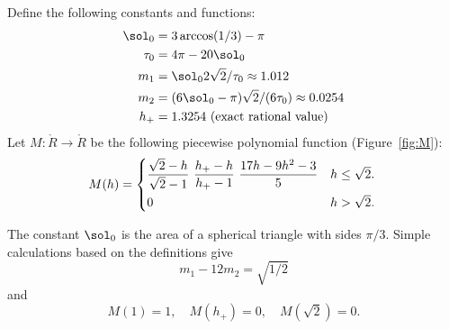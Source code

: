 \begin{definition} 
%
%
%
%
%
%
Define the following constants and functions: 
\begin{align}\label{eqn:m-def} 
\sol_0 &= 3\arccos(1/3)-\pi\\
\tau_0 &= 4\pi  - 20\sol_0\\
m_1 &= \sol_0 2\sqrt2/\tau_0 \approx 1.012 \\ %
m_2  &=  (6\sol_0- \pi)\sqrt2/(6 \tau_0) \approx 0.0254\\ %
h_+ &= 1.3254 \hbox{~(exact rational value)}
\end{align}
Let $M:\ring{R}\to\ring{R}$ 
be the following piecewise polynomial function (Figure~\ref{fig:M}):
\begin{equation}\label{eqn:M} 
M(h) =
\begin{cases} 
\dfrac{\sqrt2-h}{\sqrt2-1}~%
\dfrac{h_+-h}{h_+-1} ~\dfrac{17 h - 9 h^2 - 3}{5} 
& h \le \sqrt2.\vspace{3pt} \\
0 & h >\sqrt2.
\end{cases}
\\
\end{equation}
\end{definition}

\tuligly

The constant $\sol_0$
is the area of a spherical triangle with sides $\pi/3$.
Simple calculations based on the definitions give
\begin{equation}\label{eqn:km}
m_1 - 12m_2 = \sqrt{1/2}
\end{equation} 
and
\begin{equation}
M(1) = 1,\quad M(h_+)=0,\quad M(\sqrt2) =0.
\end{equation} 

